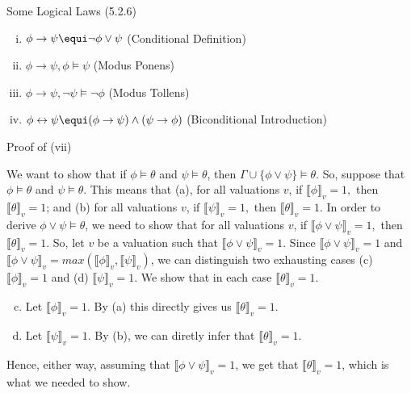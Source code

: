 \begin{frame}{Some Logical Laws (5.2.6)}
{\begin{enumerate}[(i)]
				\item $\phi\to\psi\equi \neg\phi\lor\psi$ \hfill (Conditional Definition)
			
				\setcounter{enumi}{21}
				
				\item $\phi\to\psi,\phi\vDash\psi$ \hfill (Modus Ponens)
				
				\item $\phi\to\psi,\neg\psi\vDash\neg\phi$ \hfill (Modus Tollens)
				
				\item $\phi\leftrightarrow\psi\equi (\phi\to\psi)\land(\psi\to\phi)$ \hfill (Biconditional Introduction)
				
			
			\end{enumerate}
}

\end{frame}

\begin{frame}{Proof of (vii)}

We want to show that if $\phi\vDash\theta$ and $\psi\vDash\theta$, then $\Gamma\cup\{\phi\lor\psi\}\vDash\theta$. So, suppose that $\phi\vDash\theta$ and $\psi\vDash\theta$. This means that (a), for all valuations $v$, if $\llbracket \phi\rrbracket_v=1,$ then $\llbracket\theta\rrbracket_v=1$; and (b) for all valuations $v$, if $\llbracket \psi\rrbracket_v=1,$ then $\llbracket\theta\rrbracket_v=1$.	In order to derive $\phi\lor\psi\vDash\theta$, we need to show that for all valuations $v$, if $\llbracket \phi\lor\psi\rrbracket_v=1,$ then $\llbracket\theta\rrbracket_v=1$. So, let $v$ be a valuation such that $\llbracket \phi\lor\psi\rrbracket_v=1$. Since $\llbracket \phi\lor\psi\rrbracket_v=1$ and $\llbracket \phi\lor\psi\rrbracket_v=max(\llbracket \phi\rrbracket_v,\llbracket \psi\rrbracket_v)$, we can distinguish two exhausting cases (c) $\llbracket \phi\rrbracket_v=1$ and (d) $\llbracket \psi\rrbracket_v=1$. We show that in each case $\llbracket\theta\rrbracket_v=1$.
		\begin{enumerate}[(a)]
		\setcounter{enumii}{2}
			\item Let $\llbracket \phi\rrbracket_v=1$. By (a) this directly  gives us $\llbracket\theta\rrbracket_v=1$.
			
			\item Let $\llbracket \psi\rrbracket_v=1$. By (b), we can diretly infer that $\llbracket\theta\rrbracket_v=1$.
		
		\end{enumerate}
		Hence, either way, assuming that $\llbracket \phi\lor\psi\rrbracket_v=1$, we get that $\llbracket\theta\rrbracket_v=1$, which is what we needed to show.


\end{frame}

